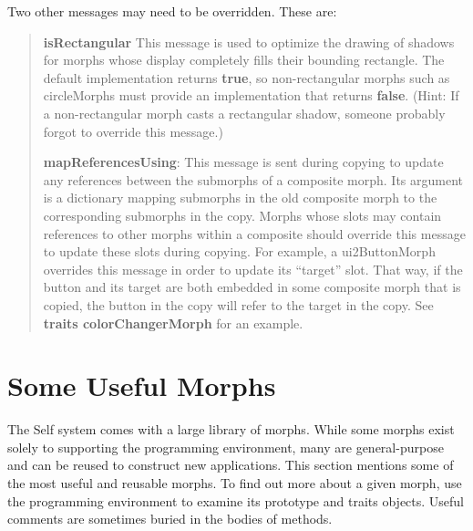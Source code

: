 \documentclass[letterpaper,10pt,english]{sphinxmanual}
\begin{document}
Two other messages may need to be overridden. These are:
\begin{quote}

\textbf{isRectangular} This message is used to optimize the drawing of shadows for morphs whose display completely fills their bounding rectangle. The default implementation returns \textbf{true}, so non-rectangular morphs such as circleMorphs must provide an implementation that returns \textbf{false}. (Hint: If a non-rectangular morph casts a rectangular shadow, someone probably forgot to override this message.)

\textbf{mapReferencesUsing}: This message is sent during copying to update any references between the submorphs of a composite morph. Its argument is a dictionary mapping submorphs in the old composite morph to the corresponding submorphs in the copy. Morphs whose slots may contain references to other morphs within a composite should override this message to update these slots during copying. For example, a ui2ButtonMorph overrides this message in order to update its “target” slot. That way, if the button and its target are both embedded in some composite morph that is copied, the button in the copy will refer to the target in the copy. See \textbf{traits colorChangerMorph} for an example.
\end{quote}


\section{Some Useful Morphs}
\label{morphic:some-useful-morphs}
The Self system comes with a large library of morphs. While some morphs exist solely to supporting the programming environment, many are general-purpose and can be reused to construct new applications. This section mentions some of the most useful and reusable morphs. To find out more about a given morph, use the programming environment to examine its prototype and traits objects. Useful comments are sometimes buried in the bodies of methods.
\end{document}
